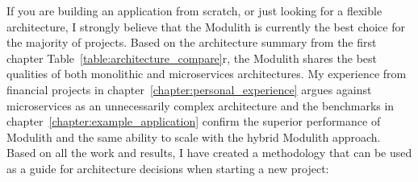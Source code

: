 
If you are building an application from scratch, or just looking for a flexible architecture, I strongly believe that the Modulith is currently the best choice for the majority of projects. Based on the architecture summary from the first chapter Table~\ref{table:architecture_compare}r, the Modulith shares the best qualities of both monolithic and microservices architectures. My experience from financial projects in chapter~\ref{chapter:personal_experience} argues against microservices as an unnecessarily complex architecture and the benchmarks in chapter~\ref{chapter:example_application} confirm the superior performance of Modulith and the same ability to scale with the hybrid Modulith approach. Based on all the work and results, I have created a methodology that can be used as a guide for architecture decisions when starting a new project:

